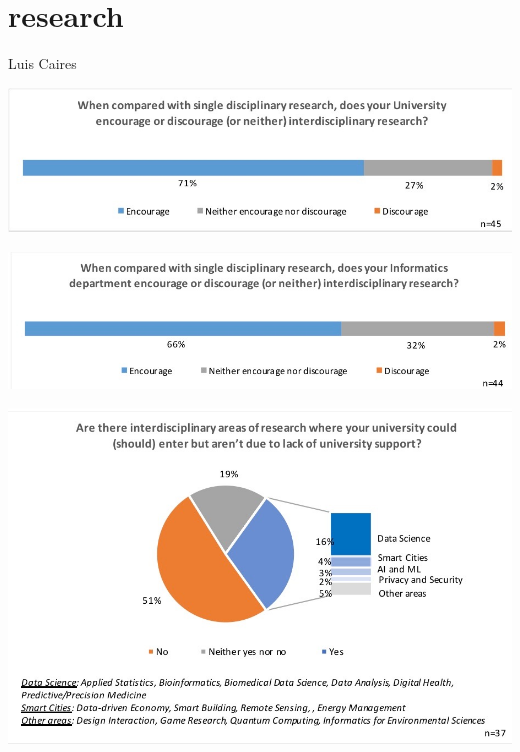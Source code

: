 \section{research}

Luis Caires


\includegraphics[width = \linewidth]{charts/1a.jpg}

\includegraphics[width = \linewidth]{charts/1b.jpg}

\includegraphics[width = \linewidth]{charts/1c.jpg}


